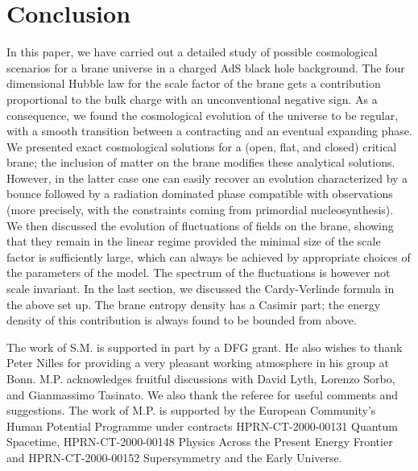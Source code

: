 \documentclass[a4paper,11pt]{article}
\begin{document}


\section{Conclusion\label{CONCLUSION}}

In this paper, we have carried out a detailed study of possible
cosmological scenarios for a brane universe in a charged AdS black hole
background. The four dimensional Hubble law for the scale factor of the
brane gets a contribution proportional to the bulk  charge with an 
unconventional negative sign. As a consequence, we found the cosmological 
evolution of the universe to be regular, with a smooth transition between 
a contracting and an eventual expanding phase. We presented exact
cosmological solutions for a (open, flat, and closed) critical brane; the
inclusion of matter on the brane modifies these analytical solutions.
However, in the latter case one can easily recover an evolution
characterized by a bounce followed by a radiation dominated phase
compatible with observations (more precisely, with the constraints coming
from primordial nucleosynthesis). We then discussed the evolution of
fluctuations of fields on the brane, showing that they remain in the
linear regime provided the minimal size of the scale factor is
sufficiently large, which can always be achieved by appropriate choices of
the parameters of the model. The spectrum of the fluctuations is however
not scale invariant. In the last section, we discussed the Cardy-Verlinde
formula in the above set  up. The brane entropy density has a Casimir
part; the energy density of this contribution is always found to be
bounded from above.

\vskip 0.5cm

The work of S.M. is supported  in part by a DFG grant. He also wishes to 
thank Peter Nilles for providing a very pleasant working atmosphere in his
group at Bonn. M.P. acknowledges fruitful discussions with David Lyth,
Lorenzo Sorbo, and Gianmassimo Tasinato. We also thank the referee for
useful comments and suggestions. The work of M.P. is supported by the
European Community's Human Potential  Programme under contracts
HPRN-CT-2000-00131 Quantum Spacetime,  HPRN-CT-2000-00148 Physics Across
the Present Energy Frontier and  HPRN-CT-2000-00152 Supersymmetry and the
Early Universe.



%
\end{document}
